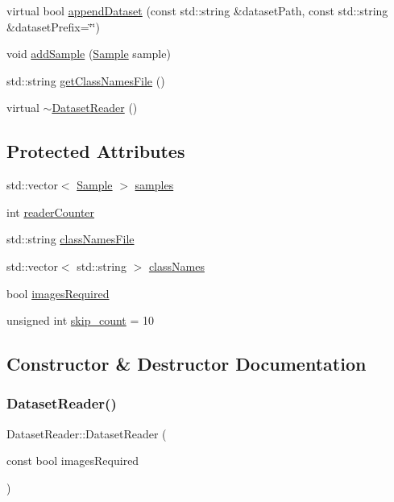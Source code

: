 \begin{DoxyCompactItemize}
\item 
virtual bool \hyperlink{class_dataset_reader_a732438244cec7c20294f93c6b635888c}{append\+Dataset} (const std\+::string \&dataset\+Path, const std\+::string \&dataset\+Prefix=\char`\"{}\char`\"{})
\item 
void \hyperlink{class_dataset_reader_a03ceb33ec8ecd5fb73a4b17e9701cbb3}{add\+Sample} (\hyperlink{struct_sample}{Sample} sample)
\item 
std\+::string \hyperlink{class_dataset_reader_a2838c12e627e42e8394fd18011afa203}{get\+Class\+Names\+File} ()
\item 
virtual \hyperlink{class_dataset_reader_af972d4b7460587b2292d3dd15e69827b}{$\sim$\+Dataset\+Reader} ()
\end{DoxyCompactItemize}
\subsection*{Protected Attributes}
\begin{DoxyCompactItemize}
\item 
std\+::vector$<$ \hyperlink{struct_sample}{Sample} $>$ \hyperlink{class_dataset_reader_adeafe74d71d96205e2920f76d3fc6a72}{samples}
\item 
int \hyperlink{class_dataset_reader_af0fd759568c5db7187d19bae8ebe1b6c}{reader\+Counter}
\item 
std\+::string \hyperlink{class_dataset_reader_a45ded43b56539f1e37a24ca9c94b4611}{class\+Names\+File}
\item 
std\+::vector$<$ std\+::string $>$ \hyperlink{class_dataset_reader_a76c52c7db385a4a930021fe69d04fefb}{class\+Names}
\item 
bool \hyperlink{class_dataset_reader_a71d04d25d58e0e9a0c05d69afcff03a1}{images\+Required}
\item 
unsigned int \hyperlink{class_dataset_reader_aae9a49629ae536c02b726e52a9def4ee}{skip\+\_\+count} = 10
\end{DoxyCompactItemize}


\subsection{Constructor \& Destructor Documentation}
\mbox{\label{class_dataset_reader_a357a86043c584062497bbc0fcd3ea420}} 
\subsubsection{\texorpdfstring{Dataset\+Reader()}{DatasetReader()}}
{\footnotesize\ttfamily Dataset\+Reader\+::\+Dataset\+Reader (\begin{DoxyParamCaption}\item[{const bool}]{images\+Required }\end{DoxyParamCaption})}

